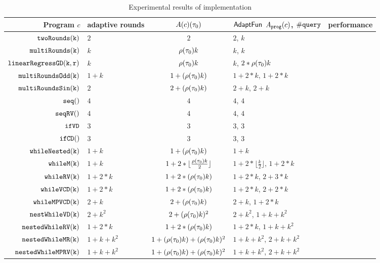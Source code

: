 \begin {table}[H]
    \caption{Experimental results of {\THESYSTEM} implementation}
        \label{tb:adapt-imp}
        \begin{center}
        \centering
{\footnotesize
        \begin{tabular}{ r | p{12mm} | c | p{25mm} | l}
         Program $c$ & adaptive \newline rounds 
         & $A(c) (\mathtt{\tau}_0)$ 
         & $\textsf{AdaptFun}$ \newline $A_{\mathtt{prog}}(c)$, $\# {\tt query}$ 
         & performance \\ 
         \hline
         \hline
         $  \mathtt{twoRounds(k)}$ & $2$ & $2$ & $2$, $k$ &  \\
         $  \mathtt{multiRounds(k)}$ & $k$ & $ \rho(\mathtt{\tau}_0) k $ & $k$, $k$  &    \\
         $  \mathtt{linearRegressGD(k, r)}$ & $k$ & $\rho(\mathtt{\tau}_0) k$ & $k$, $2 * \rho(\mathtt{\tau}_0) k$  &    \\
         $  \mathtt{multiRoundsOdd(k)}$ & $1 + k$ & $1 + (\rho(\mathtt{\tau}_0) k) $  & $1 +2 * k$, $1 + 2*k$  &    \\
         $  \mathtt{multiRoundsSin(k)}$    & $2$ & $2 + (\rho(\mathtt{\tau}_0) k) $ & $2 + k$, $2 + k$  &    \\
         $\mathtt{seq()}$ & $4$ & $4$ & $4$, $4$  \\ 
         $\mathtt{seqRV()}$ & $4$ & $4$ & $4$, $4$ \\  
         $ \mathtt{ifVD}$ & $3$ & $3$ & $3$, $3$ \\
         $\mathtt{ifCD()}$ & $3$ & $3$ & $3$, $3$  &    \\
         $ \mathtt{whileNested(k)}$ & $1+k$ & $1+ (\rho(\mathtt{\tau}_0) k)$ & $1+k$  &    \\
         $ \mathtt{whileM(k)}$ & $1 + k$ & $1 +2 * \lfloor \frac{\rho(\mathtt{\tau}_0) k}{2} \rfloor$ & $1 +2 * \lfloor \frac{k}{2} \rfloor$, $1 + 2 * k$  &    \\
         $ \mathtt{whileRV(k)}$ & $1 + 2*k$ & $1 + 2*(\rho(\mathtt{\tau}_0) k)$ & $1 + 2*k$, $2 + 3 * k$  &    \\
         $ \mathtt{whileVCD(k)}$ & $1 + 2*k$ & $1 + 2*(\rho(\mathtt{\tau}_0) k)$ & $1 + 2 * k$, $2 + 2 * k$  &    \\
         $ \mathtt{whileMPVCD(k)}$ & $2 + k$ & $2 + (\rho(\mathtt{\tau}_0) k)$  & $2 + k$, $1 + 2 * k$   &    \\
         $ \mathtt{nestWhileVD(k)}$ & $2 + k^2$ & $2 + (\rho(\mathtt{\tau}_0) k)^2$  & $2 + k^2$, $1 + k + k^2$   &    \\
         $ \mathtt{nestedWhileRV(k)}$ & $1 + 2*k$ & $1 + 2*(\rho(\mathtt{\tau}_0) k)$ & $1 + 2*k$,  $1 + k + k^2$   &    \\
         $ \mathtt{nestedWhileMR(k)}$ & $1 + k + k^2$ & $1 + (\rho(\mathtt{\tau}_0) k) + (\rho(\mathtt{\tau}_0) k)^2$  & $1 + k + k^2$,  $2 + k + k^2$  &    \\
         $ \mathtt{nestedWhileMPRV(k)}$ & $1 + k + k^2$ & $1 + (\rho(\mathtt{\tau}_0) k) + (\rho(\mathtt{\tau}_0) k)^2$  & $1 + k + k^2$,  $2 + k + k^2$  &    \\
        \end{tabular}
}        
\end{center}
\end{table}
%
